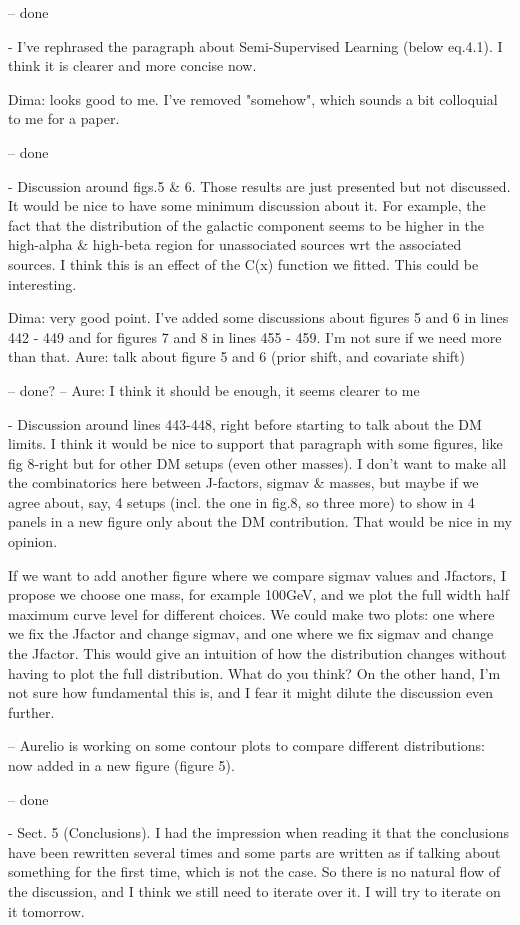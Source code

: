 -- done

- I've rephrased the paragraph about Semi-Supervised Learning (below eq.4.1). I think it is clearer and more concise now.

Dima: looks good to me. I've removed "somehow", which sounds a bit colloquial to me for a paper.

-- done

- Discussion around figs.5 & 6. Those results are just presented but not discussed. It would be nice to have some minimum discussion about it. For example, the fact that the distribution of the galactic component seems to be higher in the high-alpha & high-beta region for unassociated sources wrt the associated sources. I think this is an effect of the C(x) function we fitted. This could be interesting.

Dima: very good point. I've added some discussions about figures 5 and 6 in lines 442 - 449 and for figures 7 and 8 in lines 455 - 459.
I'm not sure if we need more than that.
Aure: talk about figure 5 and 6 (prior shift, and covariate shift)

-- done?
-- Aure: I think it should be enough, it seems clearer to me


- Discussion around lines 443-448, right before starting to talk about the DM limits. I think it would be nice to support that paragraph with some figures, like fig 8-right but for other DM setups (even other masses). I don't want to make all the combinatorics here between J-factors, sigmav & masses, but maybe if we agree about, say, 4 setups (incl. the one in fig.8, so three more) to show in 4 panels in a new figure only about the DM contribution. That would be nice in my opinion.

If we want to add another figure where we compare sigmav values and Jfactors, I propose we choose one mass, for example 100GeV, and we plot the full width half maximum curve level for different choices. We could make two plots: one where we fix the Jfactor and change sigmav, and one where we fix sigmav and change the Jfactor. This would give an intuition of how the distribution changes without having to plot the full distribution. What do you think? 
On the other hand, I'm not sure how fundamental this is, and I fear it might dilute the discussion even further. 

-- Aurelio is working on some contour plots to compare different distributions: now added in a new figure (figure 5).

-- done

- Sect. 5 (Conclusions). I had the impression when reading it that the conclusions have been rewritten several times and some parts are written as if talking about something for the first time, which is not the case. So there is no natural flow of the discussion, and I think we still need to iterate over it. I will try to iterate on it tomorrow. 


